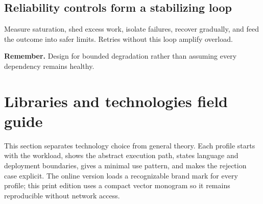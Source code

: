 \subsection{Reliability controls form a stabilizing loop}
 \quad Measure saturation, shed excess work, isolate failures, recover gradually, and feed the outcome into safer limits. Retries without this loop amplify overload.
\begin{center}\end{center}
\colorbox{paper}{\parbox{0.96\linewidth}{\textbf{Remember.} Design for bounded degradation rather than assuming every dependency remains healthy.}}
\clearpage\section{Libraries and technologies field guide}
This section separates technology choice from general theory. Each profile starts with the workload, shows the abstract execution path, states language and deployment boundaries, gives a minimal use pattern, and makes the rejection case explicit. The online version loads a recognizable brand mark for every profile; this print edition uses a compact vector monogram so it remains reproducible without network access.
